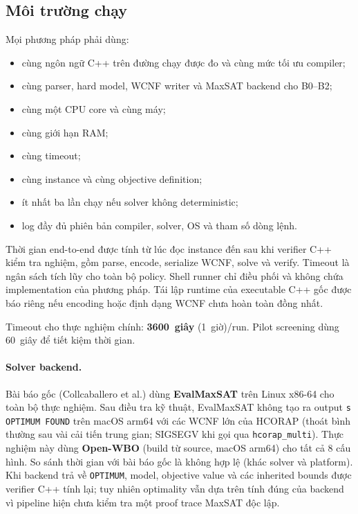\documentclass[12pt,a4paper]{article}
\begin{document}
\subsection{Môi trường chạy}

Mọi phương pháp phải dùng:
\begin{itemize}
  \item cùng ngôn ngữ C++ trên đường chạy được đo và cùng mức tối ưu compiler;
  \item cùng parser, hard model, WCNF writer và MaxSAT backend cho B0--B2;
  \item cùng một CPU core và cùng máy;
  \item cùng giới hạn RAM;
  \item cùng timeout;
  \item cùng instance và cùng objective definition;
  \item ít nhất ba lần chạy nếu solver không deterministic;
  \item log đầy đủ phiên bản compiler, solver, OS và tham số dòng lệnh.
\end{itemize}

Thời gian end-to-end được tính từ lúc đọc instance đến sau khi verifier C++
kiểm tra nghiệm, gồm parse, encode, serialize WCNF, solve và verify. Timeout là
ngân sách tích lũy cho toàn bộ policy. Shell runner chỉ điều phối và không chứa
implementation của phương pháp. Tái lập runtime của executable C++ gốc được
báo riêng nếu encoding hoặc định dạng WCNF chưa hoàn toàn đồng nhất.

Timeout cho thực nghiệm chính: \textbf{3600~giây} (1~giờ)/run.
Pilot screening dùng 60~giây để tiết kiệm thời gian.

\paragraph{Solver backend.}
Bài báo gốc (Collcaballero et al.) dùng \textbf{EvalMaxSAT} trên Linux
x86-64 cho toàn bộ thực nghiệm. Sau điều tra kỹ thuật,
EvalMaxSAT không tạo ra output \texttt{s OPTIMUM FOUND} trên macOS arm64
với các WCNF lớn của HCORAP (thoát bình thường sau vài cải tiến trung gian;
SIGSEGV khi gọi qua \texttt{hcorap\_multi}). Thực nghiệm này dùng
\textbf{Open-WBO} (build từ source, macOS arm64) cho tất cả 8 cấu hình.
So sánh thời gian với bài báo gốc là không hợp lệ (khác solver và platform).
Khi backend trả về \texttt{OPTIMUM}, model, objective value và các inherited
bounds được verifier C++ tính lại; tuy nhiên optimality vẫn dựa trên tính đúng
của backend vì pipeline hiện chưa kiểm tra một proof trace MaxSAT độc lập.
\end{document}
